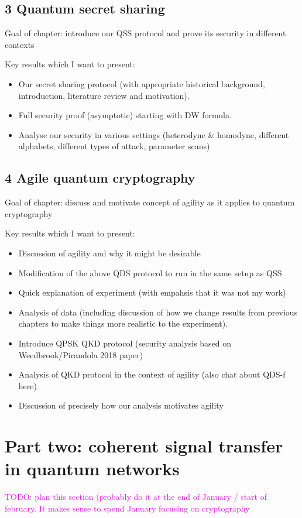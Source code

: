 \documentclass{article}
\def\MT #1{\textcolor{magenta}{#1}}
\begin{document}
\subsection*{3 Quantum secret sharing}
Goal of chapter: introduce our QSS protocol and prove its security in different contexts

Key results which I want to present:
\begin{itemize}
\item Our secret sharing protocol (with appropriate historical background, introduction, literature review and motivation). 
\item Full security proof (asymptotic) starting with DW formula.
\item Analyse our security in various settings (heterodyne \& homodyne, different alphabets, different types of attack, parameter scans)
\end{itemize}

\subsection*{4 Agile quantum cryptography}
Goal of chapter: discuss and motivate concept of agility as it applies to quantum cryptography

Key results which I want to present:
\begin{itemize}
\item Discussion of agility and why it might be desirable
\item Modification of the above QDS protocol to run in the same setup as QSS
\item Quick explanation of experiment (with empahsis that it was not my work)
\item Analysis of data (including discussion of how we change results from previous chapters to make things more realistic to the experiment). 
\item Introduce QPSK QKD protocol (security analysis based on Weedbrook/Pirandola 2018 paper)
\item Analysis of QKD protocol in the context of agility (also chat about QDS-f here)
\item Discussion of precisely how our analysis motivates agility
\end{itemize}


\section*{Part two: coherent signal transfer in quantum networks}
\MT{TODO: plan this section (probably do it at the end of January / start of february. It makes sense to spend January focusing on cryptography}
\end{document}

